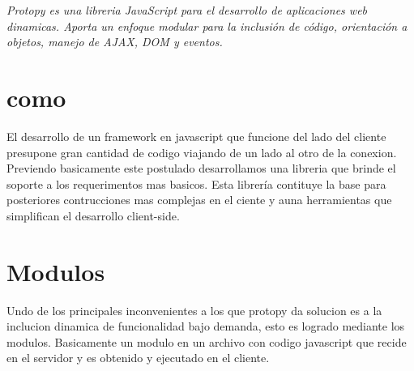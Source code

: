 \textit{Protopy es una libreria JavaScript para el desarrollo de aplicaciones
web dinamicas. Aporta un enfoque modular para la inclusión de código,
orientación a objetos, manejo de AJAX, DOM y eventos.}

\section{como}

El desarrollo de un framework en javascript que funcione del lado del cliente
presupone gran cantidad de codigo
viajando de un lado al otro de la conexion. Previendo basicamente este postulado
desarrollamos una libreria
que brinde el soporte a los requerimentos mas basicos.
Esta librería contituye la base para posteriores contrucciones mas complejas en
el ciente y auna herramientas
que simplifican el desarrollo client-side.


\section{Modulos}
Undo de los principales inconvenientes a los que protopy da solucion es a la
inclucion dinamica de funcionalidad bajo demanda,
esto es logrado mediante los modulos.
Basicamente un modulo en un archivo con codigo javascript que recide en el
servidor y es obtenido y ejecutado en el cliente.
